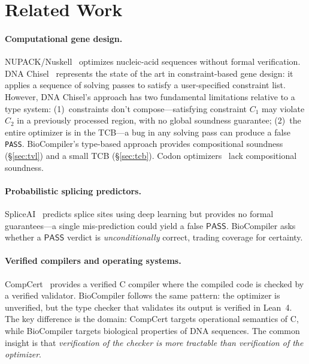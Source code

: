 \documentclass[runningheads]{llncs}
\newcommand{\PASS}{\ensuremath{\mathsf{PASS}}\xspace}
\begin{document}
\section{Related Work}\label{sec:related}

\paragraph{Computational gene design.}
NUPACK/Nuskell~\cite{zadeh2015nupack} optimizes nucleic-acid sequences without formal verification.
DNA Chisel~\cite{piret2020dnachisel} represents the state of the art in constraint-based gene design: it applies a sequence of solving passes to satisfy a user-specified constraint list.
However, DNA Chisel's approach has two fundamental limitations relative to a type system:
(1)~constraints don't compose---satisfying constraint $C_1$ may violate $C_2$ in a previously processed region, with no global soundness guarantee;
(2)~the entire optimizer is in the TCB---a bug in any solving pass can produce a false \texttt{PASS}.
BioCompiler's type-based approach provides compositional soundness (\S\ref{sec:tvl}) and a small TCB (\S\ref{sec:tcb}).
Codon optimizers~\cite{gage2006jcat,puig2007optimizer} lack compositional soundness.

\paragraph{Probabilistic splicing predictors.}
SpliceAI~\cite{jaganathan2019spliceai} predicts splice sites using deep learning but provides no formal guarantees---a single mis-prediction could yield a false \PASS.
BioCompiler asks whether a \PASS{} verdict is \emph{unconditionally} correct, trading coverage for certainty.

\paragraph{Verified compilers and operating systems.}
CompCert~\cite{leroy2009compcert} provides a verified C compiler where the compiled code is checked by a verified validator.
BioCompiler follows the same pattern: the optimizer is unverified, but the type checker that validates its output is verified in Lean~4.
The key difference is the domain: CompCert targets operational semantics of C, while BioCompiler targets biological properties of DNA sequences.
The common insight is that \emph{verification of the checker is more tractable than verification of the optimizer}.
\end{document}
